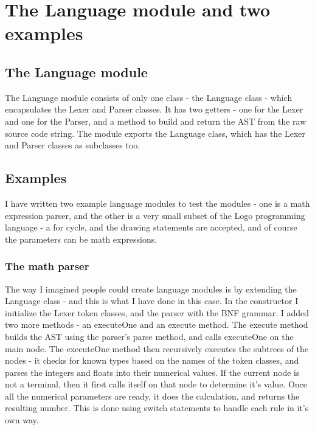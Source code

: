 \chapter{The Language module and two examples}
\section{The Language module}
The Language module consists of only one class - the Language class - which encapsulates the Lexer and Parser classes. It has two getters - one for the Lexer and one for the Parser, and a method to build and return the AST from the raw source code string.
The module exports the Language class, which has the Lexer and Parser classes as subclasses too.
\section{Examples}
I have written two example language modules to test the modules - one is a math expression parser, and the other is a very small subset of the Logo programming language - a for cycle, and the drawing statements are accepted, and of course the parameters can be math expressions.
\subsection{The math parser}
The way I imagined people could create language modules is by extending the Language class - and this is what I have done in this case. In the constructor I initialize the Lexer token classes, and the parser with the BNF grammar. I added two more methods - an executeOne and an execute method. The execute method builds the AST using the parser's parse method, and calls executeOne on the main node. The executeOne method then recursively executes the subtrees of the nodes - it checks for known types based on the names of the token classes, and parses the integers and floats into their numerical values. If the current node is not a terminal, then it first calls itself on that node to determine it's value. Once all the numerical parameters are ready, it does the calculation, and returns the resulting number. This is done using switch statements to handle each rule in it's own way.

